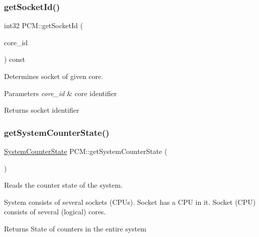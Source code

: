 \subsubsection{\texorpdfstring{get\+Socket\+Id()}{getSocketId()}}
{\footnotesize\ttfamily int32 P\+C\+M\+::get\+Socket\+Id (\begin{DoxyParamCaption}\item[{uint32}]{core\+\_\+id }\end{DoxyParamCaption}) const\hspace{0.3cm}{\ttfamily [inline]}}



Determines socket of given core. 


\begin{DoxyParams}{Parameters}
{\em core\+\_\+id} & core identifier \\
\hline
\end{DoxyParams}
\begin{DoxyReturn}{Returns}
socket identifier 
\end{DoxyReturn}
\mbox{\label{class_p_c_m_a603bf92fb67f294f5bc59185bc5c89cb}} 
\subsubsection{\texorpdfstring{get\+System\+Counter\+State()}{getSystemCounterState()}}
{\footnotesize\ttfamily \mbox{\hyperlink{class_system_counter_state}{System\+Counter\+State}} P\+C\+M\+::get\+System\+Counter\+State (\begin{DoxyParamCaption}{ }\end{DoxyParamCaption})}



Reads the counter state of the system. 

System consists of several sockets (C\+P\+Us). Socket has a C\+PU in it. Socket (C\+PU) consists of several (logical) cores.

\begin{DoxyReturn}{Returns}
State of counters in the entire system 
\end{DoxyReturn}
\mbox{\label{class_p_c_m_a728347cf85816c42833a1a8a1f14b861}} 
